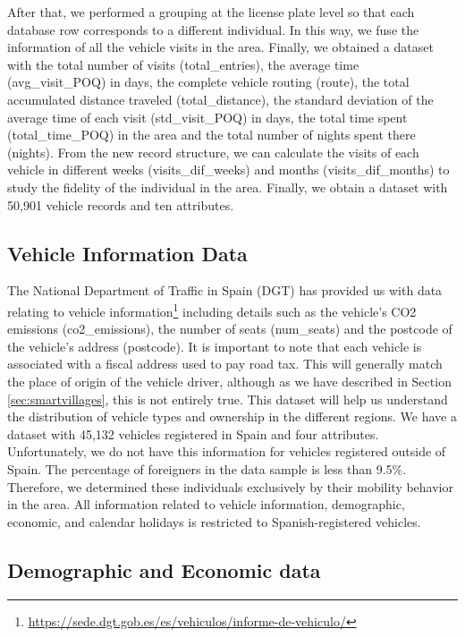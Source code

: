 After that, we performed a grouping at the license plate level so that each database row corresponds to a different individual. In this way, we fuse the information of all the vehicle visits in the area. Finally, we obtained a dataset with the total number of visits (total\_entries), the average time (avg\_visit\_POQ) in days, the complete vehicle routing (route), the total accumulated distance traveled (total\_distance), the standard deviation of the average time of each visit (std\_visit\_POQ) in days, the total time spent (total\_time\_POQ) in the area and the total number of nights spent there (nights). From the new record structure, we can calculate the visits of each vehicle in different weeks (visits\_dif\_weeks) and months (visits\_dif\_months) to study the fidelity of the individual in the area. Finally, we obtain a dataset with 50,901 vehicle records and ten attributes.

\subsection*{Vehicle Information Data} \label{sec:DGT}

The National Department of Traffic in Spain (DGT) has provided us with data relating to vehicle information\footnote{\url{https://sede.dgt.gob.es/es/vehiculos/informe-de-vehiculo/}} including details such as the vehicle's CO2 emissions (co2\_emissions), the number of seats (num\_seats) and the postcode of the vehicle's address (postcode). It is important to note that each vehicle is associated with a fiscal address used to pay road tax.  This will generally match the place of origin of the vehicle driver, although as we have described in Section \ref{sec:smartvillages}, this is not entirely true. This dataset will help us understand the distribution of vehicle types and ownership in the different regions. We have a dataset with 45,132 vehicles registered in Spain and four attributes. Unfortunately, we do not have this information for vehicles registered outside of Spain. The percentage of foreigners in the data sample is less than 9.5\%. Therefore, we determined these individuals exclusively by their mobility behavior in the area. All information related to vehicle information, demographic, economic, and calendar holidays is restricted to Spanish-registered vehicles.   

\subsection*{Demographic and Economic data}


